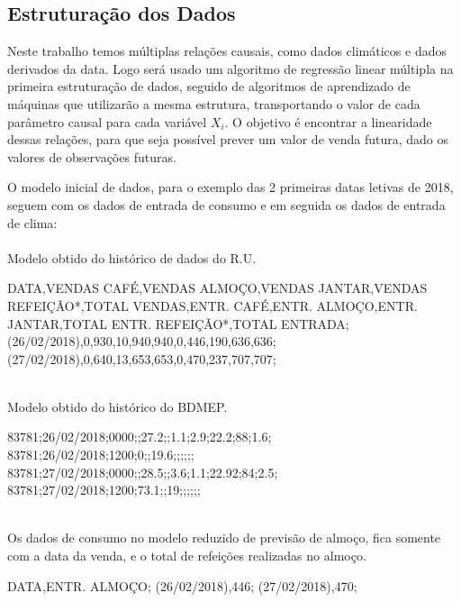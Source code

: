 \documentclass[	12pt, Times, openright, twoside, a4paper, english, brazil]{abntex2}
\begin{document}
          \subsection{Estruturação dos Dados}
            Neste trabalho temos múltiplas relações causais, como dados climáticos e dados derivados da data. Logo será usado um algoritmo de regressão linear múltipla na primeira estruturação de dados, seguido de algoritmos de aprendizado de máquinas que utilizarão a mesma estrutura, transportando o valor de cada parâmetro causal para cada variável $X_i$.
            O objetivo é encontrar a linearidade dessas relações, para que seja possível prever um valor de venda futura, dado os valores de observações futuras.

            O modelo inicial de dados, para o exemplo das 2 primeiras datas letivas de 2018, seguem com os dados de entrada de consumo e em seguida os dados de entrada de clima:\\\\
            
            Modelo obtido do histórico de dados do R.U.\\
            \begin{algorithm}
            DATA,VENDAS CAFÉ,VENDAS ALMOÇO,VENDAS JANTAR,VENDAS REFEIÇÃO*,TOTAL VENDAS,ENTR. CAFÉ,ENTR. ALMOÇO,ENTR. JANTAR,TOTAL ENTR. REFEIÇÃO*,TOTAL ENTRADA;
            (26/02/2018),0,930,10,940,940,0,446,190,636,636;
            (27/02/2018),0,640,13,653,653,0,470,237,707,707;   
            \end{algorithm}\\
            
            Modelo obtido do histórico do BDMEP.\\
            \begin{algorithm}
            83781;26/02/2018;0000;;27.2;;1.1;2.9;22.2;88;1.6;
            83781;26/02/2018;1200;0;;19.6;;;;;;
            83781;27/02/2018;0000;;28.5;;3.6;1.1;22.92;84;2.5;
            83781;27/02/2018;1200;73.1;;19;;;;;;   
            \end{algorithm}\\
            
            Os dados de consumo no modelo reduzido de previsão de almoço, fica somente com a data da venda, e o total de refeições realizadas no almoço.\\

            \begin{algorithm}
            DATA,ENTR. ALMOÇO;
            (26/02/2018),446;
            (27/02/2018),470;   
            \end{algorithm}\\
\end{document}
